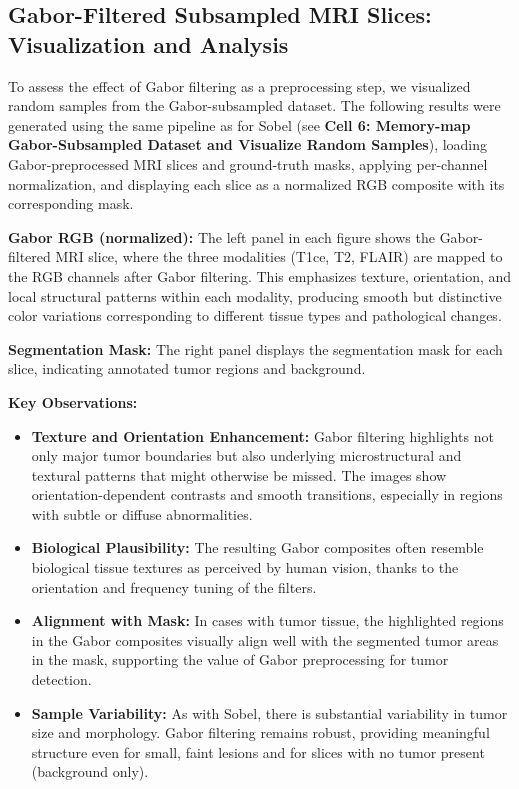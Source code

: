 \subsection{Gabor-Filtered Subsampled MRI Slices: Visualization and Analysis}

To assess the effect of Gabor filtering as a preprocessing step, we visualized random samples from the Gabor-subsampled dataset. The following results were generated using the same pipeline as for Sobel (see \textbf{Cell 6: Memory-map Gabor-Subsampled Dataset and Visualize Random Samples}), loading Gabor-preprocessed MRI slices and ground-truth masks, applying per-channel normalization, and displaying each slice as a normalized RGB composite with its corresponding mask.

\textbf{Gabor RGB (normalized):} The left panel in each figure shows the Gabor-filtered MRI slice, where the three modalities (T1ce, T2, FLAIR) are mapped to the RGB channels after Gabor filtering. This emphasizes texture, orientation, and local structural patterns within each modality, producing smooth but distinctive color variations corresponding to different tissue types and pathological changes.

\textbf{Segmentation Mask:} The right panel displays the segmentation mask for each slice, indicating annotated tumor regions and background.

\textbf{Key Observations:}
\begin{itemize}
    \item \textbf{Texture and Orientation Enhancement:} Gabor filtering highlights not only major tumor boundaries but also underlying microstructural and textural patterns that might otherwise be missed. The images show orientation-dependent contrasts and smooth transitions, especially in regions with subtle or diffuse abnormalities.
    \item \textbf{Biological Plausibility:} The resulting Gabor composites often resemble biological tissue textures as perceived by human vision, thanks to the orientation and frequency tuning of the filters.
    \item \textbf{Alignment with Mask:} In cases with tumor tissue, the highlighted regions in the Gabor composites visually align well with the segmented tumor areas in the mask, supporting the value of Gabor preprocessing for tumor detection.
    \item \textbf{Sample Variability:} As with Sobel, there is substantial variability in tumor size and morphology. Gabor filtering remains robust, providing meaningful structure even for small, faint lesions and for slices with no tumor present (background only).
\end{itemize}


